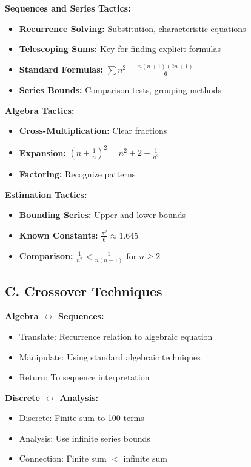 \documentclass[12pt]{article}
\begin{document}
\begin{tacticalbox}
\textbf{Sequences and Series Tactics:}
\begin{itemize}
    \item \textbf{Recurrence Solving:} Substitution, characteristic equations
    \item \textbf{Telescoping Sums:} Key for finding explicit formulas
    \item \textbf{Standard Formulas:} $\sum n^2 = \frac{n(n+1)(2n+1)}{6}$
    \item \textbf{Series Bounds:} Comparison tests, grouping methods
\end{itemize}

\textbf{Algebra Tactics:}
\begin{itemize}
    \item \textbf{Cross-Multiplication:} Clear fractions
    \item \textbf{Expansion:} $(n + \frac{1}{n})^2 = n^2 + 2 + \frac{1}{n^2}$
    \item \textbf{Factoring:} Recognize patterns
\end{itemize}

\textbf{Estimation Tactics:}
\begin{itemize}
    \item \textbf{Bounding Series:} Upper and lower bounds
    \item \textbf{Known Constants:} $\frac{\pi^2}{6} \approx 1.645$
    \item \textbf{Comparison:} $\frac{1}{n^2} < \frac{1}{n(n-1)}$ for $n \geq 2$
\end{itemize}

\subsection*{C. Crossover Techniques}

\textbf{Algebra $\leftrightarrow$ Sequences:}
\begin{itemize}
    \item Translate: Recurrence relation to algebraic equation
    \item Manipulate: Using standard algebraic techniques
    \item Return: To sequence interpretation
\end{itemize}

\textbf{Discrete $\leftrightarrow$ Analysis:}
\begin{itemize}
    \item Discrete: Finite sum to 100 terms
    \item Analysis: Use infinite series bounds
    \item Connection: Finite sum $<$ infinite sum
\end{itemize}

\end{tacticalbox}
\end{document}
